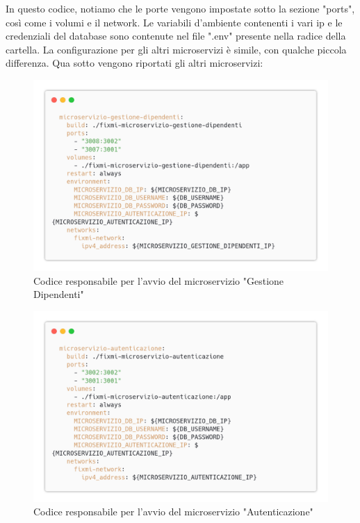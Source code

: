 \documentclass{report}
\begin{document}
In questo codice, notiamo che le porte vengono impostate sotto la sezione "ports", così come i volumi e il network. Le variabili d'ambiente contenenti i vari ip e le credenziali del database sono contenute nel file ".env" presente nella radice della cartella.
La configurazione per gli altri microservizi è simile, con qualche piccola differenza. Qua sotto vengono riportati gli altri microservizi:
\begin{figure}[H]
	\centering\includegraphics[width=1\textwidth]{images/yaml_gestione_dipendenti.png}
	Codice responsabile per l'avvio del microservizio "Gestione Dipendenti"
\end{figure}
\begin{figure}[H]
	\centering\includegraphics[width=1\textwidth]{images/yaml_autenticazione.png}
	Codice responsabile per l'avvio del microservizio "Autenticazione"
\end{figure}
\end{document}

